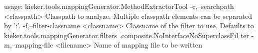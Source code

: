 usage: kieker.tools.mappingGenerator.MethodExtractorTool
 -c,--searchpath <classpath>         Classpath to analyze. Multiple
                                     classpath elements can be separated
                                     by ':'.
 -f,--filter-classname <classname>   Classname of the filter to use.
                                     Defaults to
                                     kieker.tools.mappingGenerator.filters
                                     .composite.NoInterfaceNoSuperclassFil
                                     ter
 -m,--mapping-file <filename>        Name of mapping file to be written

